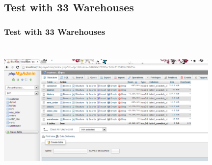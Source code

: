 \documentclass[12pt]{beamer}
\begin{document}
\subsection{Test with 33 Warehouses}
\begin{frame}[c]
\frametitle{Test with 33 Warehouses}
\centering
   \includegraphics[width=11cm, height=7cm]{images/warehouse33}

\end{frame}


\end{document}
